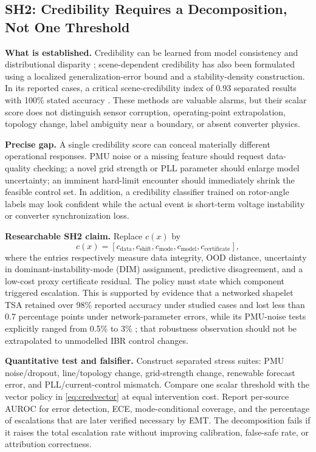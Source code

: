 \documentclass[conference]{IEEEtran}
\begin{document}
\subsection{SH2: Credibility Requires a Decomposition, Not One Threshold}

\textbf{What is established.} Credibility can be learned from model consistency and distributional disparity \cite{li2025}; scene-dependent credibility has also been formulated using a localized generalization-error bound and a stability-density construction. In its reported cases, a critical scene-credibility index of 0.93 separated results with 100\% stated accuracy \cite{liu2026sce}. These methods are valuable alarms, but their scalar score does not distinguish sensor corruption, operating-point extrapolation, topology change, label ambiguity near a boundary, or absent converter physics.

\textbf{Precise gap.} A single credibility score can conceal materially different operational responses. PMU noise or a missing feature should request data-quality checking; a novel grid strength or PLL parameter should enlarge model uncertainty; an imminent hard-limit encounter should immediately shrink the feasible control set. In addition, a credibility classifier trained on rotor-angle labels may look confident while the actual event is short-term voltage instability or converter synchronization loss.

\textbf{Researchable SH2 claim.} Replace $c(x)$ by
\begin{equation}
c(x)=[c_{\mathrm{data}},c_{\mathrm{shift}},c_{\mathrm{mode}},
c_{\mathrm{model}},c_{\mathrm{certificate}}],
\label{eq:credvector}
\end{equation}
where the entries respectively measure data integrity, OOD distance, uncertainty in dominant-instability-mode (DIM) assignment, predictive disagreement, and a low-cost proxy certificate residual. The policy must state which component triggered escalation. This is supported by evidence that a networked shapelet TSA retained over 98\% reported accuracy under studied cases and lost less than 0.7 percentage points under network-parameter errors, while its PMU-noise tests explicitly ranged from 0.5\% to 3\% \cite{zhu2022shapelet}; that robustness observation should not be extrapolated to unmodelled IBR control changes.

\textbf{Quantitative test and falsifier.} Construct separated stress suites: PMU noise/dropout, line/topology change, grid-strength change, renewable forecast error, and PLL/current-control mismatch. Compare one scalar threshold with the vector policy in \eqref{eq:credvector} at equal intervention cost. Report per-source AUROC for error detection, ECE, mode-conditional coverage, and the percentage of escalations that are later verified necessary by EMT. The decomposition fails if it raises the total escalation rate without improving calibration, false-safe rate, or attribution correctness.
\end{document}
